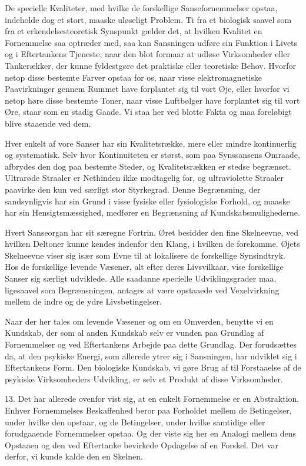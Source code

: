 \documentclass[12pt,a4paper]{book}
\newcommand{\apage}[1]{\marginnote{\footnotesize\textit{[#1]}}}
\begin{document}
De specielle Kvaliteter, med hvilke de forskellige Sansefornemmelser
opstaa, indeholde dog et stort, maaske uløseligt Problem. Ti fra et
biologisk saavel som fra et erkendelsesteoretisk Synspunkt gælder det,
at hvilken Kvalitet en Fornemmelse saa optræder med, saa kan Sansningen
udføre sin Funktion i Livets og i Eftertankens Tjeneste, naar den blot
formaar at udløse Virksomheder eller Tankerækker, der kunne fyldestgøre
det praktiske eller teoretiske Behov. Hvorfor netop disse bestemte
Farver opstaa for os, naar visse elektromagnetiske Paavirkninger gennem
Rummet have forplantet sig til vort Øje, eller hvorfor vi netop høre
disse bestemte Toner, naar visse Luftbølger have forplantet sig til vort
Øre, staar som en stadig Gaade. Vi staa her ved blotte Fakta og maa
foreløbigt blive staaende ved dem.

Hver enkelt af vore Sanser har sin Kvalitetsrække, mere eller mindre
kontinuerlig og systematisk. Selv hvor Kontinuiteten er størst, som paa
Synssansens Omraade, afbrydes den dog paa bestemte Steder, og
Kvalitetsrækken er stedse \apage{44} begrænset. Ultrarøde Straaler er Nethinden
ikke modtagelig for, og ultraviolette Straaler paavirke den kun ved
særligt stor Styrkegrad. Denne Begrænsning, der sandsynligvis har sin
Grund i visse fysiske eller fysiologiske Forhold, og maaske har sin
Hensigtsmæssighed, medfører en Begrænsning af Kundskabsmulighederne.

Hvert Sanseorgan har sit særegne Fortrin. Øret besidder den fine
Skelneevne, ved hvilken Deltoner kunne kendes indenfor den Klang, i
hvilken de forekomme. Øjets Skelneevne viser sig især som Evne til at
lokalisere de forskellige Synsindtryk. Hos de forskellige levende
Væsener, alt efter deres Livsvilkaar, vise forskellige Sanser sig
særligt udviklede. Alle saadanne specielle Udviklingsgrader maa,
ligesaavel som Begrænsningen, antages at være opstaaede ved
Vexelvirkning mellem de indre og de ydre Livsbetingelser.

Naar der her tales om levende Væsener og om en Omverden, benytte vi en
Kundskab, der som al anden Kundskab selv er vunden paa Grundlag af
Fornemmelser og ved Eftertankens Arbejde paa dette Grundlag. Der
forudsættes da, at den psykiske Energi, som allerede ytrer sig i
Sansningen, har udviklet sig i Eftertankens Form. Den biologiske
Kundskab, vi gøre Brug af til Forstaaelse af de psykiske Virksomheders
Udvikling, er selv et Produkt af disse Virksomheder.

13. Det har allerede ovenfor vist sig, at en enkelt Fornemmelse er en
Abstraktion. Enhver Fornemmelses Beskaffenhed beror paa Forholdet mellem
de Betingelser, under hvilke den opstaar, og de Betingelser, under
hvilke samtidige eller forudgaaende Fornemmelser opstaa. Og der viste
sig her en Analogi mellem dens Opstaaen og den ved Eftertanke bevirkede
Opdagelse af en Forskel. Det var derfor, vi kunde kalde den en Skelnen.
\end{document}
